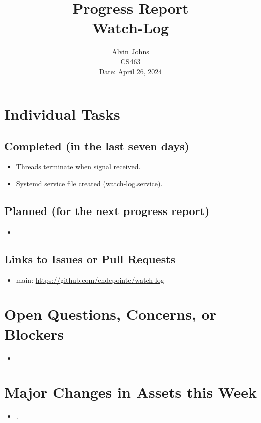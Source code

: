 \documentclass{article}
\title{Progress Report\\[0.5em]
\large Watch-Log}
\author{Alvin Johns\\
CS463\\
Date: April 26, 2024}
\date{}
\begin{document}
\maketitle

\section*{Individual Tasks}
\subsection*{Completed (in the last seven days)}
\begin{itemize}
    \item Threads terminate when signal received.
    \item Systemd service file created (watch-log.service).
\end{itemize}

\subsection*{Planned (for the next progress report)}
\begin{itemize}
    \item
\end{itemize}

\subsection*{Links to Issues or Pull Requests}
\begin{itemize}
    \item main: \url{https://github.com/endepointe/watch-log}
\end{itemize}

\section*{Open Questions, Concerns, or Blockers}
\begin{itemize}
    \item
\end{itemize}

\section*{Major Changes in Assets this Week}
\begin{itemize}
    \item.
\end{itemize}
\end{document}
